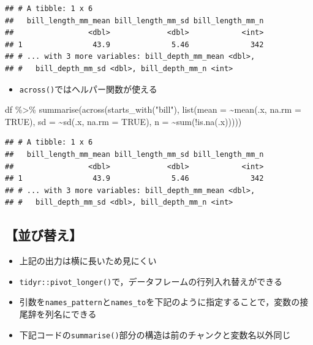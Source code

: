 \documentclass[
  xelatex,ja=standard, b5paper]{bxjsbook}
\newenvironment{Shaded}{\begin{snugshade}}{\end{snugshade}}
\newcommand{\AttributeTok}[1]{\textcolor[rgb]{0.77,0.63,0.00}{#1}}
\newcommand{\ConstantTok}[1]{\textcolor[rgb]{0.00,0.00,0.00}{#1}}
\newcommand{\FunctionTok}[1]{\textcolor[rgb]{0.00,0.00,0.00}{#1}}
\newcommand{\NormalTok}[1]{#1}
\newcommand{\SpecialCharTok}[1]{\textcolor[rgb]{0.00,0.00,0.00}{#1}}
\newcommand{\StringTok}[1]{\textcolor[rgb]{0.31,0.60,0.02}{#1}}
\providecommand{\tightlist}{%
  \setlength{\itemsep}{0pt}\setlength{\parskip}{0pt}}
\begin{document}
\begin{verbatim}
## # A tibble: 1 x 6
##   bill_length_mm_mean bill_length_mm_sd bill_length_mm_n
##                 <dbl>             <dbl>            <int>
## 1                43.9              5.46              342
## # ... with 3 more variables: bill_depth_mm_mean <dbl>,
## #   bill_depth_mm_sd <dbl>, bill_depth_mm_n <int>
\end{verbatim}

\begin{itemize}
\tightlist
\item
  \texttt{across()}ではヘルパー関数が使える
\end{itemize}

\begin{Shaded}
\begin{Highlighting}[]
\NormalTok{df }\SpecialCharTok{\%\textgreater{}\%} 
  \FunctionTok{summarise}\NormalTok{(}\FunctionTok{across}\NormalTok{(}\FunctionTok{starts\_with}\NormalTok{(}\StringTok{"bill"}\NormalTok{),}
                   \FunctionTok{list}\NormalTok{(}\AttributeTok{mean =} \SpecialCharTok{\textasciitilde{}}\FunctionTok{mean}\NormalTok{(.x, }\AttributeTok{na.rm =} \ConstantTok{TRUE}\NormalTok{),}
                        \AttributeTok{sd =} \SpecialCharTok{\textasciitilde{}}\FunctionTok{sd}\NormalTok{(.x, }\AttributeTok{na.rm =} \ConstantTok{TRUE}\NormalTok{),}
                        \AttributeTok{n =} \SpecialCharTok{\textasciitilde{}}\FunctionTok{sum}\NormalTok{(}\SpecialCharTok{!}\FunctionTok{is.na}\NormalTok{(.x)))))}
\end{Highlighting}
\end{Shaded}

\begin{verbatim}
## # A tibble: 1 x 6
##   bill_length_mm_mean bill_length_mm_sd bill_length_mm_n
##                 <dbl>             <dbl>            <int>
## 1                43.9              5.46              342
## # ... with 3 more variables: bill_depth_mm_mean <dbl>,
## #   bill_depth_mm_sd <dbl>, bill_depth_mm_n <int>
\end{verbatim}

\hypertarget{su-st-reorder}{%
\subsection{【並び替え】}\label{su-st-reorder}}

\begin{itemize}
\tightlist
\item
  上記の出力は横に長いため見にくい
\item
  \texttt{tidyr::pivot\_longer()}で，データフレームの行列入れ替えができる
\item
  引数を\texttt{names\_pattern}と\texttt{names\_to}を下記のように指定することで，変数の接尾辞を列名にできる
\item
  下記コードの\texttt{summarise()}部分の構造は前のチャンクと変数名以外同じ
\end{itemize}
\end{document}
